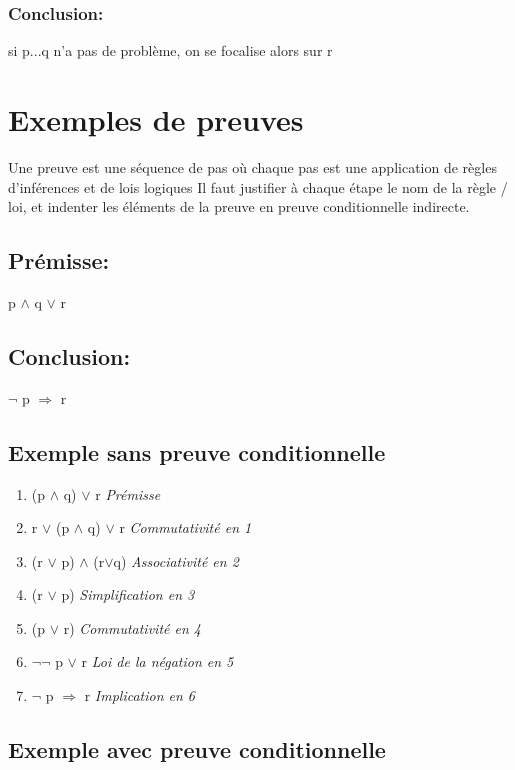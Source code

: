\subsubsection{Conclusion:}

si p...q n'a pas de problème, on se focalise alors sur r
 

\section{Exemples de preuves}

Une preuve est une séquence de pas où chaque pas est une application de règles d'inférences et de lois logiques
Il faut justifier à chaque étape le nom de la règle / loi, et indenter les éléments de la preuve en preuve conditionnelle indirecte.

\subsection{Prémisse:} 

p $\land$ q $\lor$ r

\subsection{Conclusion:}

$\lnot$ p $\Rightarrow$ r

\subsection{Exemple sans preuve conditionnelle}

\begin{enumerate}
\item   (p $\land$ q) $\lor$ r  \textit{Prémisse}
\item   r $\lor$ (p $\land$ q)  $\lor$ r \textit{Commutativité en 1}
\item   (r $\lor$ p) $\land$ (r$\lor$q) \textit{Associativité en 2}
\item   (r $\lor$ p) \textit{Simplification en 3}
\item   (p $\lor$ r) \textit{Commutativité en 4}
\item   $\lnot$$\lnot$ p $\lor$ r \textit{Loi de la négation en 5}
\item   $\lnot$ p $\Rightarrow$ r \textit{Implication en 6}
\end{enumerate}

\subsection{Exemple avec preuve conditionnelle}

